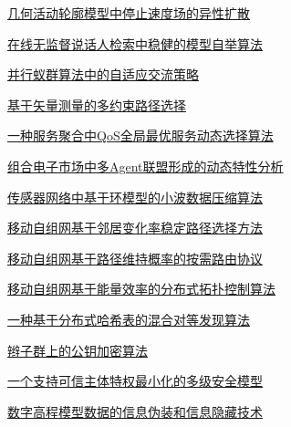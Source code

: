 \documentclass[a4paper]{article}
\begin{document}
\href{http://www.jos.org.cn/ch/reader/download_pdf.aspx?file_no=20070313&year_id=2007&quarter_id=3&falg=1}{几何活动轮廓模型中停止速度场的异性扩散}

\href{http://www.jos.org.cn/ch/reader/download_pdf.aspx?file_no=20070314&year_id=2007&quarter_id=3&falg=1}{在线无监督说话人检索中稳健的模型自举算法}

\href{http://www.jos.org.cn/ch/reader/download_pdf.aspx?file_no=20070315&year_id=2007&quarter_id=3&falg=1}{并行蚁群算法中的自适应交流策略}

\href{http://www.jos.org.cn/ch/reader/download_pdf.aspx?file_no=20070317&year_id=2007&quarter_id=3&falg=1}{基于矢量测量的多约束路径选择}

\href{http://www.jos.org.cn/ch/reader/download_pdf.aspx?file_no=20070318&year_id=2007&quarter_id=3&falg=1}{一种服务聚合中QoS全局最优服务动态选择算法}

\href{http://www.jos.org.cn/ch/reader/download_pdf.aspx?file_no=20070319&year_id=2007&quarter_id=3&falg=1}{组合电子市场中多Agent联盟形成的动态特性分析}

\href{http://www.jos.org.cn/ch/reader/download_pdf.aspx?file_no=20070320&year_id=2007&quarter_id=3&falg=1}{传感器网络中基于环模型的小波数据压缩算法}

\href{http://www.jos.org.cn/ch/reader/download_pdf.aspx?file_no=20070321&year_id=2007&quarter_id=3&falg=1}{移动自组网基于邻居变化率稳定路径选择方法}

\href{http://www.jos.org.cn/ch/reader/download_pdf.aspx?file_no=20070322&year_id=2007&quarter_id=3&falg=1}{移动自组网基于路径维持概率的按需路由协议}

\href{http://www.jos.org.cn/ch/reader/download_pdf.aspx?file_no=20070323&year_id=2007&quarter_id=3&falg=1}{移动自组网基于能量效率的分布式拓扑控制算法}

\href{http://www.jos.org.cn/ch/reader/download_pdf.aspx?file_no=20070324&year_id=2007&quarter_id=3&falg=1}{一种基于分布式哈希表的混合对等发现算法}

\href{http://www.jos.org.cn/ch/reader/download_pdf.aspx?file_no=20070325&year_id=2007&quarter_id=3&falg=1}{辫子群上的公钥加密算法}

\href{http://www.jos.org.cn/ch/reader/download_pdf.aspx?file_no=20070326&year_id=2007&quarter_id=3&falg=1}{一个支持可信主体特权最小化的多级安全模型}

\href{http://www.jos.org.cn/ch/reader/download_pdf.aspx?file_no=20070327&year_id=2007&quarter_id=3&falg=1}{数字高程模型数据的信息伪装和信息隐藏技术}
\end{document}
